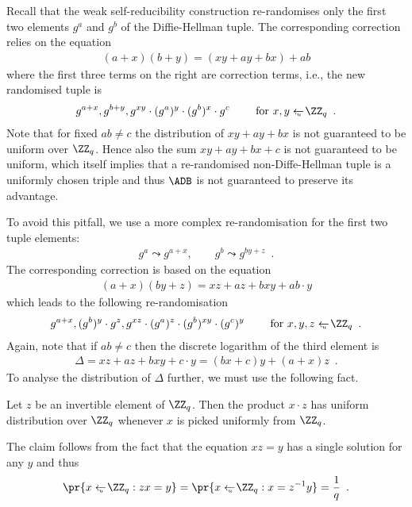 \documentclass{crypto-exercise}
\begin{document}
\begin{solution} 
Recall that the weak self-reducibility construction re-randomises only the first two elements $g^a$ and $g^b$ of the Diffie-Hellman tuple. The corresponding correction relies on the equation 
\begin{align*}
(a+x)(b+y) = (xy + ay + bx) + ab  
\end{align*}
where the first three terms on the right are correction terms, i.e., the new randomised tuple is
\begin{align*}
g^{a+x}, g^{b+y}, g^{xy}\cdot (g^{a})^y\cdot (g^{b})^x \cdot g^c \qquad\text{ for } x,y\getsu \ZZ_q\enspace.
\end{align*}
Note that for fixed $ab\neq c$ the distribution  of $xy + ay + bx$ is not guaranteed to be uniform over $\ZZ_q$. Hence also the sum $xy + ay + bx +c$ is not guaranteed to be uniform, which itself implies that a re-randomised non-Diffe-Hellman tuple is a uniformly chosen triple and thus $\ADB$ is not guaranteed to preserve its advantage. 

To avoid this pitfall, we use a more complex re-randomisation for the first two tuple elements:
\begin{align*}
g^a\leadsto g^{a+x}, \qquad g^b\leadsto g^{by+z}\enspace.
\end{align*}       
The corresponding correction is based on the equation
\begin{align*}
(a+x)(by+z) = xz + az + bxy + ab\cdot y
\end{align*}
which leads to the following re-randomisation
\begin{align*}
g^{a+x}, (g^{b})^y\cdot g^z, g^{xz}\cdot (g^{a})^z\cdot (g^{b})^{xy} \cdot (g^c)^y \qquad\text{ for } x,y,z\getsu \ZZ_q\enspace.
\end{align*}
Again, note that if $ab\neq c$ then the discrete logarithm of the third element is 
\begin{align*}
\Delta = xz + az + bxy + c\cdot y=(bx + c) y + (a + x) z\enspace.
\end{align*} 
To analyse the distribution of $\Delta$ further, we must use the following fact.  

\begin{lemma}
Let $z$ be an invertible element of $\ZZ_q$. Then the product $x \cdot z$ has uniform distribution over $\ZZ_q$ whenever $x$ is picked uniformly from $\ZZ_q$.
\end{lemma}
\noindent The claim follows from the fact that the equation $xz=y$ has a single solution for any $y$ and thus
\begin{align*}
 \pr{x\getsu\ZZ_q: zx=y}=\pr{x\getsu\ZZ_q: x=z^{-1} y}= \frac{1}{q}\enspace. 
\end{align*}


\end{solution}
\end{document}

